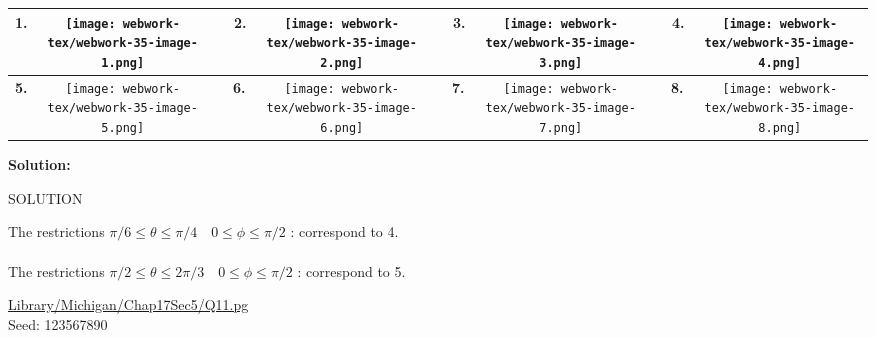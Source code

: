\documentclass[10pt,]{book}
\theoremstyle{plain}
\theoremstyle{definition}
\theoremstyle{definition}
\theoremstyle{definition}
\theoremstyle{definition}
\theoremstyle{definition}
\numberwithin{equation}{section}
\begin{document}
\begin{exercisegroup}
\begin{mdframed}
{\begin{center}
\par\smallskip\begin{center}\begin{tabular}{|c|c|c|c|c|c|c|c|} \hline

{\bf 1.} &\texttt{[image: webwork-tex/webwork-35-image-1.png]}
 &\ \ {\bf 2.} &\texttt{[image: webwork-tex/webwork-35-image-2.png]}
 &\ \ {\bf 3.} &\texttt{[image: webwork-tex/webwork-35-image-3.png]}
 &\ \ {\bf 4.} &\texttt{[image: webwork-tex/webwork-35-image-4.png]}
 \\ \hline 

{\bf 5.} &\texttt{[image: webwork-tex/webwork-35-image-5.png]}
 &\ \ {\bf 6.} &\texttt{[image: webwork-tex/webwork-35-image-6.png]}
 &\ \ {\bf 7.} &\texttt{[image: webwork-tex/webwork-35-image-7.png]}
 &\ \ {\bf 8.} &\texttt{[image: webwork-tex/webwork-35-image-8.png]}
 \\ \hline 


\end {tabular}\end{center}\par\smallskip

\end{center} 




\par \par {\bf Solution: }\par  SOLUTION \par 

The restrictions
\(\pi/6 \leq\theta\le \pi/4 \quad 0\le\phi\leq \pi/2\) :
correspond to 4.
\leavevmode\\\relax \leavevmode\\\relax 
The restrictions
\(\pi/2 \leq\theta\le 2\pi/3 \quad 0\le\phi\leq \pi/2\) :
correspond to 5. 


\par 
}\par\vspace*{2ex}%
{\tiny\ttfamily\noindent\url{Library/Michigan/Chap17Sec5/Q11.pg}\\Seed: 123567890\hfill}\end{mdframed}
\end{exercisegroup}
\par\smallskip\noindent
\end{document}
